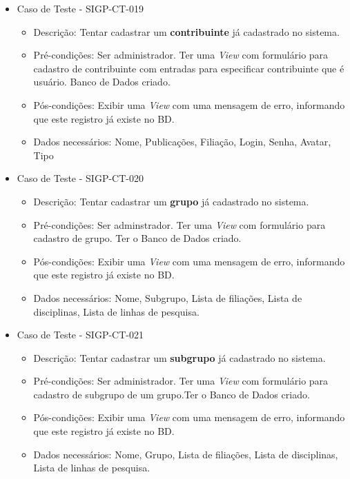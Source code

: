 \documentclass[11pt, a4paper]{book}
\begin{document}
\begin{itemize}
\item  Caso de Teste - SIGP-CT-019
	\begin{itemize}
	\item Descrição: Tentar cadastrar um \textbf{contribuinte} já cadastrado no sistema.
	\item Pré-condições: Ser administrador. Ter uma \emph{View} com formulário para cadastro de contribuinte com entradas para especificar contribuinte que é usuário. Banco de Dados criado.
	\item Pós-condições: Exibir uma \emph{View} com uma mensagem de erro, informando que este registro já existe no BD.
	\item Dados necessários: Nome, Publicações, Filiação, Login, Senha, Avatar, Tipo
	\end{itemize}

	\item Caso de Teste - SIGP-CT-020
	\begin{itemize}
	\item Descrição: Tentar cadastrar um \textbf{grupo} já cadastrado no sistema.
	\item Pré-condições: Ser adminstrador. Ter uma \emph{View} com formulário para cadastro de grupo. Ter o Banco de Dados criado.
	\item Pós-condições: Exibir uma \emph{View} com uma mensagem de erro, informando que este registro já existe no BD.
	\item Dados necessários: Nome, Subgrupo, Lista de filiações, Lista de disciplinas, Lista de linhas de pesquisa.
	\end{itemize}

	\item Caso de Teste - SIGP-CT-021
	\begin{itemize}
	\item Descrição: Tentar cadastrar um \textbf{subgrupo} já cadastrado no sistema.
	\item Pré-condições: Ser administrador. Ter uma \emph{View} com formulário para cadastro de subgrupo de um grupo.Ter o Banco de Dados criado.
	\item Pós-condições: Exibir uma \emph{View} com uma mensagem de erro, informando que este registro já existe no BD.
	\item Dados necessários: Nome, Grupo, Lista de filiações, Lista de disciplinas, Lista de linhas de pesquisa.
	\end{itemize}

\newpage


\end{itemize}
\end{document}

